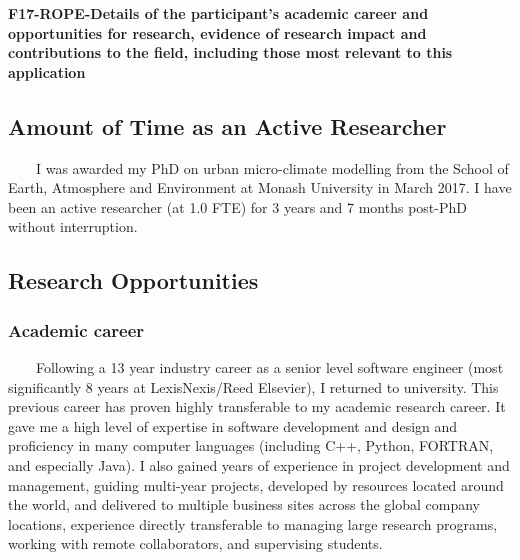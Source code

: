 \noindent \textbf{F17-ROPE-Details of the participant's academic career and opportunities for research, evidence of research impact and contributions to the field, including those most relevant to this application }\\ \noindent 





\subsection*{\TitleFont Amount of Time as an Active Researcher}

~~~~I was awarded my PhD on urban micro-climate modelling from the School of Earth, Atmosphere and Environment at Monash University in March 2017. I have been an active researcher (at 1.0 FTE) for 3 years and 7 months post-PhD without interruption.

\subsection*{\TitleFont Research Opportunities}

\subsubsection*{\textbf{Academic career}}



~~~~Following a 13 year industry career as a senior level software engineer (most significantly 8 years at LexisNexis/Reed Elsevier), I returned to university. This previous career has proven highly transferable to my academic research career. It gave me a high level of expertise in software development and design and proficiency in many computer languages (including C++, Python, FORTRAN, and especially Java). I also gained years of experience in project development and management, guiding multi-year projects, developed by resources located around the world, and delivered to multiple business sites across the global company locations, experience directly transferable to managing large research programs, working with remote collaborators, and supervising students.

